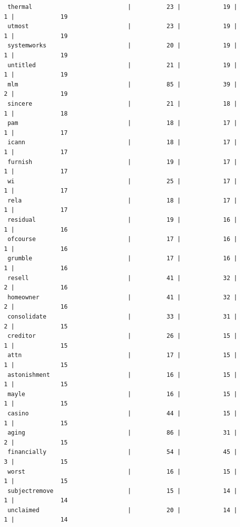 \documentclass[a4paper,12pt]{article}
\begin{document}
\begin{verbatim}
 thermal                           |          23 |            19 |            1 |             19
 utmost                            |          23 |            19 |            1 |             19
 systemworks                       |          20 |            19 |            1 |             19
 untitled                          |          21 |            19 |            1 |             19
 mlm                               |          85 |            39 |            2 |             19
 sincere                           |          21 |            18 |            1 |             18
 pam                               |          18 |            17 |            1 |             17
 icann                             |          18 |            17 |            1 |             17
 furnish                           |          19 |            17 |            1 |             17
 wi                                |          25 |            17 |            1 |             17
 rela                              |          18 |            17 |            1 |             17
 residual                          |          19 |            16 |            1 |             16
 ofcourse                          |          17 |            16 |            1 |             16
 grumble                           |          17 |            16 |            1 |             16
 resell                            |          41 |            32 |            2 |             16
 homeowner                         |          41 |            32 |            2 |             16
 consolidate                       |          33 |            31 |            2 |             15
 creditor                          |          26 |            15 |            1 |             15
 attn                              |          17 |            15 |            1 |             15
 astonishment                      |          16 |            15 |            1 |             15
 mayle                             |          16 |            15 |            1 |             15
 casino                            |          44 |            15 |            1 |             15
 aging                             |          86 |            31 |            2 |             15
 financially                       |          54 |            45 |            3 |             15
 worst                             |          16 |            15 |            1 |             15
 subjectremove                     |          15 |            14 |            1 |             14
 unclaimed                         |          20 |            14 |            1 |             14
	\end{verbatim}
\end{document}
